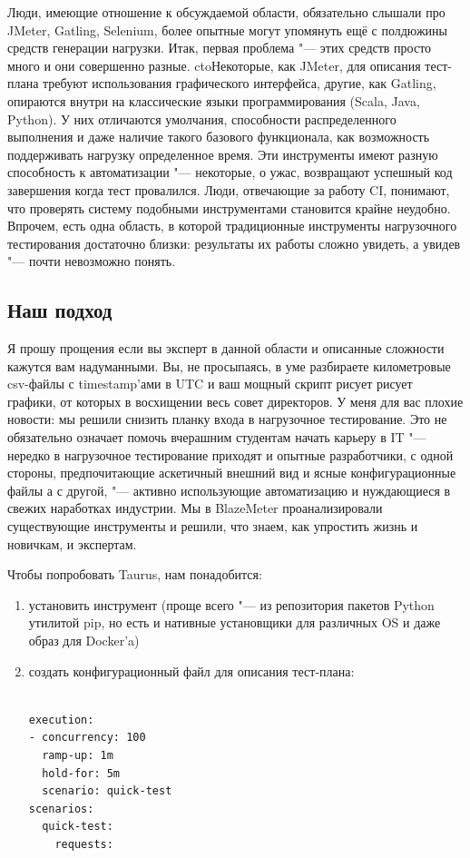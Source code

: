 \documentclass[10pt, a5paper]{article}
\begin{document}
Люди, имеющие отношение к обсуждаемой области, обязательно слышали про JMeter, Gatling, Selenium, более опытные могут упомянуть ещё с полдюжины средств генерации нагрузки. Итак, первая проблема "--- этих средств просто много и они совершенно разные. ctoНекоторые, как JMeter, для описания тест-плана требуют использования графического интерфейса, другие, как Gatling, опираются внутри на классические языки программирования (Scala, Java, Python). У них отличаются умолчания, способности распределенного выполнения и даже наличие такого базового функционала, как возможность поддерживать нагрузку определенное время. Эти инструменты имеют разную способность к автоматизации "--- некоторые, о ужас, возвращают успешный код завершения когда тест провалился. Люди, отвечающие за работу CI, понимают, что проверять систему подобными инструментами становится крайне неудобно. Впрочем, есть одна область, в которой традиционные инструменты нагрузочного тестирования достаточно близки: результаты их работы сложно увидеть, а увидев "--- почти невозможно понять.

\subsection*{Наш подход}

Я прошу прощения если вы эксперт в данной области и описанные сложности кажутся вам надуманными. Вы, не просыпаясь, в уме разбираете километровые csv-файлы с timestamp’ами в UTC и ваш мощный скрипт рисует рисует графики, от которых в восхищении весь совет директоров. У меня для вас плохие новости: мы решили снизить планку входа в нагрузочное тестирование. Это не обязательно означает помочь вчерашним студентам начать карьеру в IT "--- нередко в нагрузочное тестирование приходят и опытные разработчики, с одной стороны, предпочитающие аскетичный внешний вид и ясные конфигурационные файлы а с другой, "--- активно использующие автоматизацию и нуждающиеся в свежих наработках индустрии. Мы в BlazeMeter проанализировали существующие инструменты и решили, что знаем, как упростить жизнь и новичкам, и экспертам.

Чтобы попробовать Taurus, нам понадобится:

\begin{enumerate}
  \item установить инструмент (проще всего "--- из репозитория пакетов Python утилитой pip, но есть и нативные установщики для различных OS и даже образ для Docker’a)
  \item создать конфигурационный файл для описания тест-плана:
\lstset{ %
anguage=C,                 %
basicstyle=\small\sffamily, %
breaklines=true,           %
breakatwhitespace=false, %
}

\begin{lstlisting}

execution:
- concurrency: 100
  ramp-up: 1m
  hold-for: 5m
  scenario: quick-test
scenarios:
  quick-test:
    requests:
\end{lstlisting}
\end{enumerate}
\end{document}
